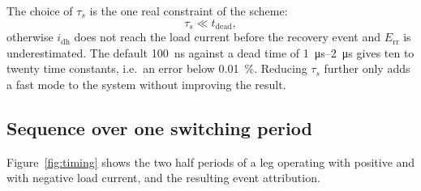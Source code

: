 \documentclass[11pt,a4paper]{article}
\newcommand{\Err}{E_\mathrm{rr}}
\begin{document}
The choice of $\tau_s$ is the one real constraint of the scheme:
\begin{equation}
  \tau_s \ll t_\mathrm{dead},
\end{equation}
otherwise $i_\mathrm{dh}$ does not reach the load current before the recovery
event and $\Err$ is underestimated. The default \SI{100}{\nano\second} against a
dead time of \SIrange{1}{2}{\micro\second} gives ten to twenty time constants,
i.e.\ an error below \SI{0.01}{\percent}. Reducing $\tau_s$ further only adds a
fast mode to the system without improving the result.

\subsection{Sequence over one switching period}

Figure~\ref{fig:timing} shows the two half periods of a leg operating with
positive and with negative load current, and the resulting event attribution.
\end{document}
